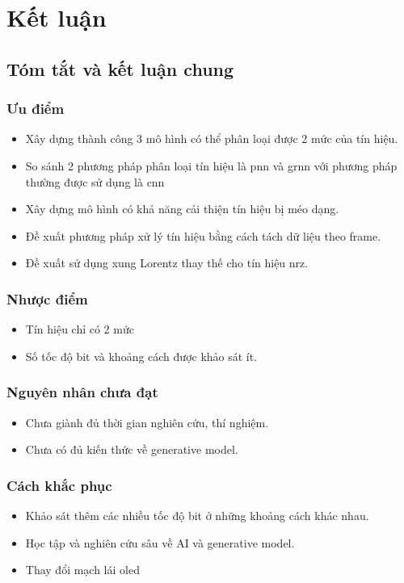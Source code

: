 \chapter{Kết luận}\label{sec:chapter_4}
\section{Tóm tắt và kết luận chung}

\subsection{Ưu điểm}
\begin{itemize}
\item Xây dựng thành công 3 mô hình có thể phân loại được 2 mức của tín hiệu.
\item So sánh 2 phương pháp phân loại tín hiệu là \ac{pnn} và \ac{grnn} với phương pháp thường được sử dụng là \ac{cnn}
\item Xây dựng mô hình có khả năng cải thiện tín hiệu bị méo dạng.
\item Đề xuất phương pháp xử lý tín hiệu bằng cách tách dữ liệu theo frame.
\item Đề xuất sử dụng xung Lorentz thay thế cho tín hiệu \ac{nrz}.
\end{itemize}

\subsection{Nhược điểm}
\begin{itemize}
\item Tín hiệu chỉ có 2 mức
\item Số tốc độ bit và khoảng cách được khảo sát ít. 
\end{itemize}
\subsection{Nguyên nhân chưa đạt}
\begin{itemize}
\item Chưa giành đủ thời gian nghiên cứu, thí nghiệm.
\item Chưa có đủ kiến thức về generative model.
\end{itemize}

\subsection{Cách khắc phục}
\begin{itemize}
\item Khảo sát thêm các nhiều tốc độ bit ở những khoảng cách khác nhau.
\item Học tập và nghiên cứu sâu về AI và generative model.
\item Thay đổi mạch lái \ac{oled}
\end{itemize}

